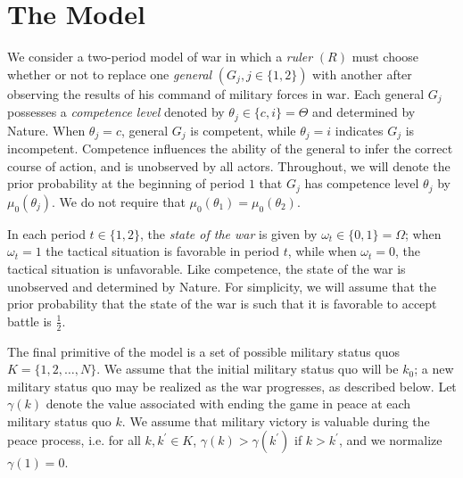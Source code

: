 \documentclass[11pt,]{article}
\begin{document}
\section{The Model}
We consider a two-period model of war in which a \textit{ruler} $(R)$ must choose whether or not to replace one \textit{general} $(G_j,j\in\{1,2\})$ with another after observing the results of his command of military forces in war.  Each general $G_j$ possesses a \textit{competence level} denoted by $\theta_{j}\in\{c,i\}=\Theta$ and determined by Nature.  When $\theta_{j}=c$, general $G_j$ is competent, while $\theta_{j}=i$ indicates $G_j$ is incompetent.  Competence influences the ability of the general to infer the correct course of action, and is unobserved by all actors.  Throughout, we will denote the prior probability at the beginning of period $1$ that $G_j$ has competence level $\theta_{j}$ by $\mu_0(\theta_{j})$.  We do not require that $\mu_0(\theta_{1})=\mu_0(\theta_{2})$.  



In each period $t\in\{1,2\}$, the \textit{state of the war} is given by $\omega_t\in\{0,1\}=\Omega$; when $\omega_t=1$ the tactical situation is favorable in period $t$, while when $\omega_t=0$, the tactical situation is unfavorable.  Like competence, the state of the war is unobserved and determined by Nature.  For simplicity, we will assume that the prior probability that the state of the war is such that it is favorable to accept battle is $\frac{1}{2}$.


The final primitive of the model is a set of possible military status quos $K=\{1,2,\hdots,N\}$.  We assume that the initial military status quo will be $k_0$; a new military status quo may be realized as the war progresses, as described below.  Let $\gamma(k)$ denote the value associated with ending the game in peace at each military status quo $k$.  We assume that military victory is valuable during the peace process, i.e. for all $k,k^{\prime}\in K$, $\gamma(k)>\gamma(k^{\prime})$ if $k>k^{\prime}$, and we normalize $\gamma(1)=0$.
\end{document}
